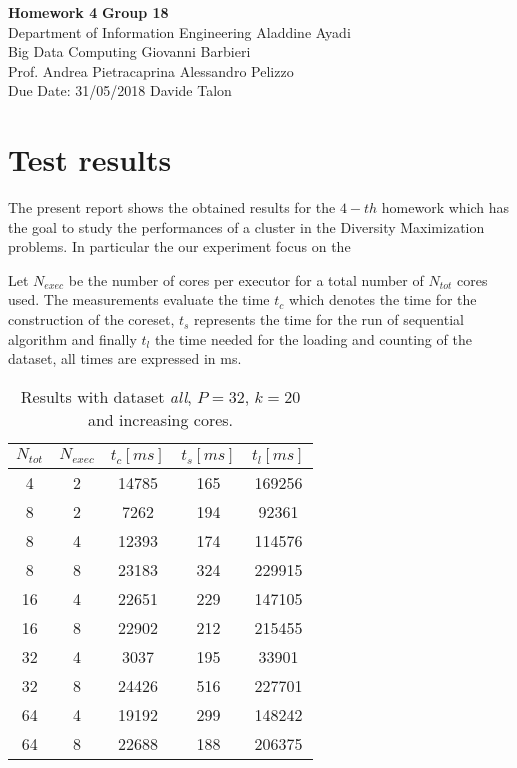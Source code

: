 \documentclass[a4paper, 11pt]{article}
\begin{document}
\noindent
\large\textbf{Homework 4} \hfill \textbf{Group 18} \\
\normalsize Department of Information Engineering \hfill Aladdine Ayadi\\
Big Data Computing \hfill Giovanni Barbieri\\
Prof. Andrea Pietracaprina \hfill Alessandro Pelizzo\\
Due Date: 31/05/2018 \hfill Davide Talon


\section*{Test results}
The present report shows the obtained results for the $4-th$ homework which has the goal to study the performances of a cluster in the Diversity Maximization problems. In particular the our experiment focus on the

Let $N_{exec}$ be the number of cores per executor for a total number of $N_{tot}$  cores used. The measurements evaluate the time $t_c$ which denotes the time for the construction of the coreset, $t_s$ represents the time for the run of sequential algorithm and finally $t_l$ the time needed for the loading and counting of the dataset, all times are expressed in ms.


\bgroup
\def\arraystretch{1.3}%
\begin{footnotesize}
	\begin{table}[!htb]
		\centering
		\vspace{10pt}
		\caption{Results with dataset \textit{all}, $P=32$, $k=20$  and increasing cores.}\label{table:a}
		\begin{tabular}{c|c|c|c|c} 
			\hline
			\textbf{$N_{tot}$} & \textbf{$N_{exec}$} & \textbf{$t_c [ms]$} & \textbf{$t_s [ms]$} & \textbf{$t_l [ms]$} \\
			\hline
			4 & 2 & 14785 & 165 & 169256\\ 
			8 & 2 & 7262 & 194 & 92361 \\
			8 & 4 & 12393 & 174 & 114576\\
			8 & 8 & 23183 & 324 & 229915\\
			16 & 4 & 22651 & 229 & 147105\\
			16 & 8 & 22902 & 212 & 215455\\
			32 & 4 & 3037 & 195 & 33901\\
			32 & 8 & 24426 & 516 & 227701\\
			64 & 4 & 19192 & 299 & 148242\\
			64 & 8 & 22688& 188 & 206375\\
			\hline
		\end{tabular}
	\end{table}
\end{footnotesize}
\egroup
\end{document}
